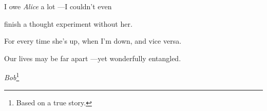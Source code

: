\cleardoublepage
\thispagestyle{empty}

\begin{savenotes}
  \epigraph{\small
    I owe \emph{Alice} a lot
    ---I couldn't even

    finish a thought experiment without her.

    For every time she's up,
    when I'm down,
    and vice versa.

    Our lives may be far apart ---yet wonderfully entangled.
  }{\small
    \emph{Bob}\hspace{1pt}\footnote{ Based on a true story. }
  }
\end{savenotes}

\clearpage